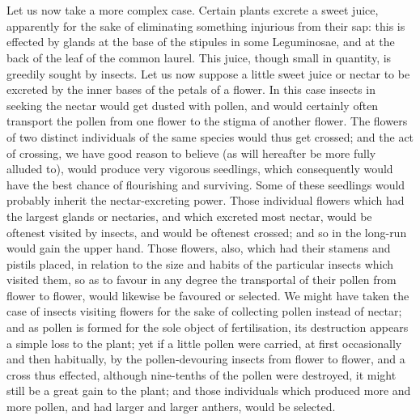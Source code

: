 \documentclass{article}
\begin{document}
\\


\\
Let us now take a more complex case. Certain plants excrete a sweet juice, apparently for the sake of eliminating something injurious from their sap: this is effected by glands at the base of the stipules in some Leguminosae, and at the back of the leaf of the common laurel. This juice, though small in quantity, is greedily sought by insects. Let us now suppose a little sweet juice or nectar to be excreted by the inner bases of the petals of a flower. In this case insects in seeking the nectar would get dusted with pollen, and would certainly often transport the pollen from one flower to the stigma of another flower. The flowers of two distinct individuals of the same species would thus get crossed; and the act of crossing, we have good reason to believe (as will hereafter be more fully alluded to), would produce very vigorous seedlings, which consequently would have the best chance of flourishing and surviving. Some of these seedlings would probably inherit the nectar-excreting power. Those individual flowers which had the largest glands or nectaries, and which excreted most nectar, would be oftenest visited by insects, and would be oftenest crossed; and so in the long-run would gain the upper hand. Those flowers, also, which had their stamens and pistils placed, in relation to the size and habits of the particular insects which visited them, so as to favour in any degree the transportal of their pollen from flower to flower, would likewise be favoured or selected. We might have taken the case of insects visiting flowers for the sake of collecting pollen instead of nectar; and as pollen is formed for the sole object of fertilisation, its destruction appears a simple loss to the plant; yet if a little pollen were carried, at first occasionally and then habitually, by the pollen-devouring insects from flower to flower, and a cross thus effected, although nine-tenths of the pollen were destroyed, it might still be a great gain to the plant; and those individuals which produced more and more pollen, and had larger and larger anthers, would be selected.\\
\end{document}
